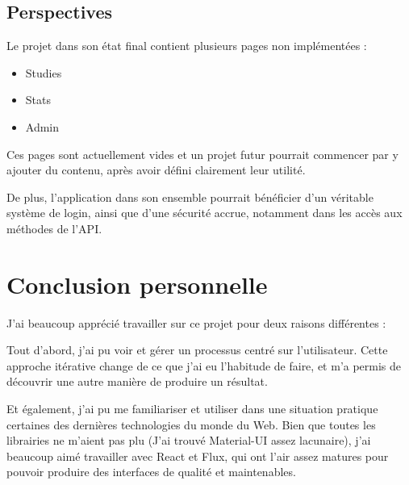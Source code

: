	\subsection{Perspectives}

		Le projet dans son état final contient plusieurs pages non implémentées :

		\begin{itemize}
			\item Studies
			\item Stats
			\item Admin
		\end{itemize}

		Ces pages sont actuellement vides et un projet futur pourrait commencer par y ajouter du contenu, après avoir défini clairement leur utilité.

		De plus, l'application dans son ensemble pourrait bénéficier d'un véritable système de login, ainsi que d'une sécurité accrue, notamment dans les accès aux méthodes de l'API.


\section{Conclusion personnelle}

	J'ai beaucoup apprécié travailler sur ce projet pour deux raisons différentes :

	Tout d'abord, j'ai pu voir et gérer un processus centré sur l'utilisateur. Cette approche itérative change de ce que j'ai eu l'habitude de faire, et m'a permis de découvrir une autre manière de produire un résultat.

	Et également, j'ai pu me familiariser et utiliser dans une situation pratique certaines des dernières technologies du monde du Web. Bien que toutes les librairies ne m'aient pas plu (J'ai trouvé Material-UI assez lacunaire), j'ai beaucoup aimé travailler avec React et Flux, qui ont l'air assez matures pour pouvoir produire des interfaces de qualité et maintenables.
	